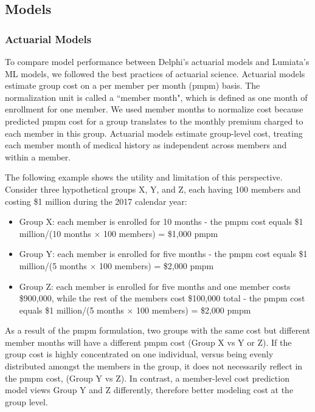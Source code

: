 \documentclass[letterpaper]{article} %
\begin{document}
\subsection{Models}\label{sec:a2}
\subsubsection{Actuarial Models} To compare model performance between Delphi's actuarial models and Lumiata's ML models, we followed the best practices of actuarial science.  Actuarial models estimate group cost on a per member per month (pmpm) basis. The normalization unit is called a ``member month", which is defined as one month of enrollment for one member. We used member months to normalize cost because predicted pmpm cost for a group translates to the monthly premium charged to each member in this group. Actuarial models estimate group-level cost, treating each member month of medical history as independent across members and within a member.  

The following example shows the utility and limitation of this perspective. Consider three hypothetical groups X, Y, and Z, each having 100 members and costing \$1 million during the 2017 calendar year:
\begin{itemize}
\itemsep0em 
\item  Group X: each member is enrolled for 10 months - the pmpm cost equals \$1 million/(10 months $\times$ 100 members) = \$1,000 pmpm
\item  Group Y: each member is enrolled for five months - the pmpm cost equals \$1 million/(5 months $\times$ 100 members) = \$2,000 pmpm
\item  Group Z: each member is enrolled for five months and one member costs \$900,000, while the rest of the members cost \$100,000 total - the pmpm cost equals \$1 million/(5 months $\times$ 100 members) = \$2,000 pmpm
\end{itemize}
As a result of the pmpm formulation, two groups with the same cost but different member months will have a different pmpm cost (Group X vs Y or Z). If the group cost is highly concentrated on one individual, versus being evenly distributed amongst the members in the group, it does not necessarily reflect in the pmpm cost, (Group Y vs Z).  In contrast, 
a member-level cost prediction model views Group Y and Z differently, therefore better modeling cost at the group level.
\end{document}
